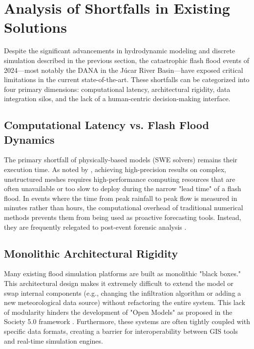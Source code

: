 \section{Analysis of Shortfalls in Existing Solutions}

Despite the significant advancements in hydrodynamic modeling and discrete simulation described in the previous section, 
the catastrophic flash flood events of 2024—most notably the DANA in the Júcar River Basin—have exposed critical limitations 
in the current state-of-the-art. These shortfalls can be categorized into four primary dimensions: computational latency, 
architectural rigidity, data integration silos, and the lack of a human-centric decision-making interface.


\subsection{Computational Latency vs. Flash Flood Dynamics}

The primary shortfall of physically-based models (SWE solvers) remains their execution time. As noted by \cite{Aleksyuk2017}, 
achieving high-precision results on complex, unstructured meshes requires high-performance computing 
resources that are often unavailable or too slow to deploy during the narrow "lead time" of a flash flood. In events 
where the time from peak rainfall to peak flow is measured in minutes rather than hours, the computational overhead of 
traditional numerical methods prevents them from being used as proactive forecasting tools. Instead, they are frequently 
relegated to post-event forensic analysis \parencite{Muoz2025}.


\subsection{Monolithic Architectural Rigidity}

Many existing flood simulation platforms are built as monolithic "black boxes." This architectural design makes it 
extremely difficult to extend the model or swap internal components (e.g., changing the infiltration algorithm or 
adding a new meteorological data source) without refactoring the entire system. This lack of modularity hinders the 
development of "Open Models" as proposed in the Society 5.0 framework \parencite{FonsecaiCasas2026}. Furthermore, 
these systems are often tightly coupled with specific data formats, creating a barrier for interoperability between 
GIS tools and real-time simulation engines.


